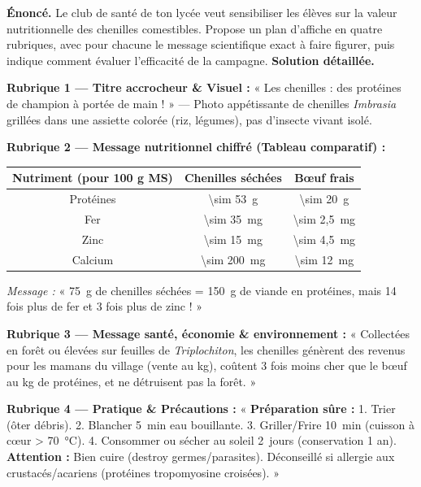 \documentclass[11pt]{article}
\begin{document}
\begin{exoresolu}
\textbf{Énoncé.} Le club de santé de ton lycée veut sensibiliser les élèves sur la valeur nutritionnelle des chenilles comestibles. Propose un plan d'affiche en quatre rubriques, avec pour chacune le message scientifique exact à faire figurer, puis indique comment évaluer l'efficacité de la campagne.
\tcblower
\textbf{Solution détaillée.}

\textbf{Rubrique 1 — Titre accrocheur \& Visuel :} « Les chenilles : des protéines de champion à portée de main ! » — Photo appétissante de chenilles \emph{Imbrasia} grillées dans une assiette colorée (riz, légumes), pas d'insecte vivant isolé.

\textbf{Rubrique 2 — Message nutritionnel chiffré (Tableau comparatif) :}
\begin{center}
\begin{tabular}{|c|c|c|}\hline
\rowcolor{popblueL} \textbf{Nutriment (pour 100 g MS)} & \textbf{Chenilles séchées} & \textbf{Bœuf frais} \\ \hline
Protéines & \SI{\sim 53}{g} & \SI{\sim 20}{g} \\ \hline
Fer & \SI{\sim 35}{mg} & \SI{\sim 2,5}{mg} \\ \hline
Zinc & \SI{\sim 15}{mg} & \SI{\sim 4,5}{mg} \\ \hline
Calcium & \SI{\sim 200}{mg} & \SI{\sim 12}{mg} \\ \hline
\end{tabular}
\end{center}
\emph{Message :} « \SI{75}{g} de chenilles séchées = \SI{150}{g} de viande en protéines, mais 14 fois plus de fer et 3 fois plus de zinc ! »

\textbf{Rubrique 3 — Message santé, économie \& environnement :} « Collectées en forêt ou élevées sur feuilles de \emph{Triplochiton}, les chenilles génèrent des revenus pour les mamans du village (vente au kg), coûtent 3 fois moins cher que le bœuf au kg de protéines, et ne détruisent pas la forêt. »

\textbf{Rubrique 4 — Pratique \& Précautions :} « \textbf{Préparation sûre :} 1. Trier (ôter débris). 2. Blancher \SI{5}{min} eau bouillante. 3. Griller/Frire \SI{10}{min} (cuisson à cœur \SI{> 70}{\celsius}). 4. Consommer ou sécher au soleil \SI{2}{jours} (conservation 1 an). \textbf{Attention :} Bien cuire (destroy germes/parasites). Déconseillé si allergie aux crustacés/acariens (protéines tropomyosine croisées). »


\end{exoresolu}
\end{document}
